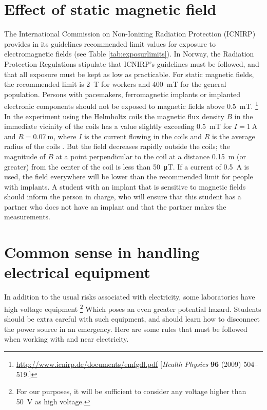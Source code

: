 \documentclass[../Elmag-labhefte-2020.tex]{subfiles}
\begin{document}
\section{Effect of static magnetic field}
The International Commission on Non-Ionizing Radiation Protection (ICNIRP) provides in its guidelines recommended limit values   for exposure to electromagnetic fields (see Table \ref{tab:exposurlimits}). In Norway, the Radiation Protection Regulations stipulate that ICNIRP's guidelines must be followed, and that all exposure must be kept as low as practicable. For static magnetic fields, the recommended limit is \SI{2}{\tesla} for workers and \SI{400}{\milli\tesla} for the general population. Persons with pacemakers, ferromagnetic implants or implanted electronic components should not be exposed to magnetic fields above \SI{0,5}{\milli\tesla}. \footnote{\url{http://www.icnirp.de/documents/emfgdl.pdf} [\textit{Health Physics} \textbf{96} (2009) 504--519.]} In the experiment using the Helmholtz coils the magnetic flux density $B$ in the immediate vicinity of the coils has a value slightly exceeding \SI{0,5}{\milli\tesla} for $I = \SI{1}{\ampere}$ and $R = \SI{0,07}{\m}$, where $I$ is the current flowing in the coils and $R$ is the average radius of the coils . But the field decreases rapidly outside the coils; the magnitude of $B$ at a point perpendicular to the coil at a distance \SI{0,15}{\m} (or greater) from the center of the coil is less than \SI{50}{\micro\tesla}. If a current of \SI{0,5}{\ampere} is used, the field everywhere will be lower than the recommended limit for people with implants. A student with an implant that is sensitive to magnetic fields should inform the person in charge, who will ensure that this student has a partner who does not have an implant and that the partner makes the measurements.


\section{Common sense in handling electrical equipment}

In addition to the usual risks associated with electricity, some laboratories have high voltage equipment \footnote{For our purposes, it will be sufficient to consider any voltage higher than \SI{50}{\V} as high voltage.} Which poses an even greater potential hazard. Students should be extra careful with such equipment, and should learn how to disconnect the power source in an emergency. Here are some rules that must be followed when working with and near electricity.
\end{document}
